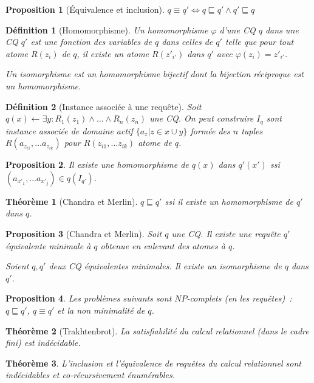 \documentclass[landscape]{article}
\newcommand{\1}{\mathbbm{1}}
\renewcommand{\phi}{\varphi}
\newtheorem{theo}{Théorème}
\newtheorem{prop}{Proposition}
\newtheorem{defi}{Définition}
\begin{document}
\begin{multicols}{2}
    \begin{prop}[Équivalence et inclusion]
        $q\equiv q' \iff q\sqsubseteq q'\wedge q'\sqsubseteq q$
    \end{prop}

    \begin{defi}[Homomorphisme]
        Un homomorphisme $\phi$ d'une CQ $q$ dans une CQ $q'$ est une fonction
        des variables de $q$ dans celles de $q'$ telle que pour tout atome
        $R(z_i)$ de $q$, il existe un atome $R(z'_{i'})$ dans $q'$ avec
        $\phi(z_i) = z'_{i'}$.

        Un isomorphisme est un homomorphisme bijectif dont la bijection réciproque
        est un homomorphisme.
    \end{defi}

    \begin{defi}[Instance associée à une requête] Soit $q(x) \leftarrow \exists y:
        R_1(z_1)\wedge\ldots\wedge R_n(z_n)$ une CQ. On peut construire $I_q$
        sont instance associée de domaine actif $\{a_z | z\in x\cup y\}$
        formée des $n$ tuples $R(a_{z_{i1}}, \ldots a_{z_{ik}})$ pour
        $R(z_{i1}, \ldots z_{ik})$ atome de $q$.
    \end{defi}

    \begin{prop} Il existe une homomorphisme de $q(x)$ dans $q'(x')$ ssi
        $(a_{x'_1}, \ldots a_{x'_j})\in q(I_{q'})$.
    \end{prop}

    \begin{theo}[Chandra et Merlin] $q\sqsubseteq q'$ ssi il existe un homomorphisme
        de $q'$ dans $q$.
    \end{theo}

    \begin{prop}[Chandra et Merlin] Soit $q$ une CQ. Il existe une requête $q'$
        équivalente minimale à $q$ obtenue en enlevant des atomes à $q$.

        Soient $q,q'$ deux CQ équivalentes minimales. Il existe un isomorphisme
        de $q$ dans $q'$.
    \end{prop}

    \begin{prop} Les problèmes suivants sont $NP$-complets (en les requêtes)~: $q\sqsubseteq q'$,
        $q \equiv q'$ et la non minimalité de $q$.
    \end{prop}

    \begin{theo}[Trakhtenbrot]
        La satisfiabilité du calcul relationnel (dans le cadre fini) est indécidable.
    \end{theo}

    \begin{theo} L'inclusion et l'équivalence de requêtes du calcul relationnel
        sont indécidables et co-récursivement énumérables.
    \end{theo}

\end{multicols}
\end{document}
